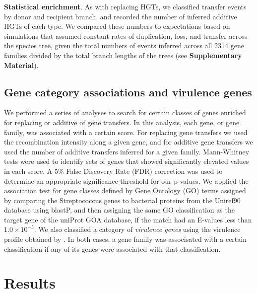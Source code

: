 \documentclass[12pt]{article}
\begin{document}
{\bf Statistical enrichment}. As with replacing
HGTs, we classified transfer events by donor and recipient branch, 
and recorded the number of inferred additive HGTs of each type.
We compared these numbers to expectations based on simulations that
assumed 
constant
rates of duplication, loss, and transfer across the species tree, given 
the total numbers of events inferred across all 2314 gene families
divided by the total branch lengths of the trees
(see \textbf{Supplementary Material}).


\subsection*{Gene category associations and virulence genes}

We performed a series of analyses to search for certain classes of genes
enriched for replacing or additive of gene transfers. In this analysis,
each gene, or gene family, was associated with a certain score. For
replacing gene transfers we used the recombination intensity along
a given gene, and for additive gene transfers we used the number of
additive transfers inferred for a given family. Mann-Whitney tests were
used to identify sets of genes that showed significantly elevated values in
each score.  A 5\% False Discovery Rate (FDR) correction
\citep{Benjamini1995} was used to determine an appropriate significance
threshold for our p-values. We applied the association test for gene
classes defined by Gene Ontology (GO) terms assigned  
by comparing the Streptococcus genes to bacterial proteins from the
Uniref90 database using blastP, and then assigning the same GO
classification as the target gene of the uniProt GOA database, if the
match had an E-values less than $1.0\times10^{-5}$. We also classified a
category of \textit{virulence genes} using the virulence profile obtained
by \cite{Suzuki2011}. In both cases, a gene family was
associsated with a certain classification if any of its genes were
associated with that classification. 




\section*{Results}
\end{document}
